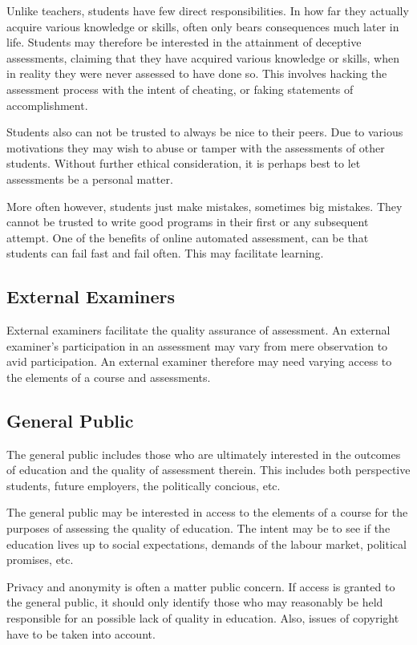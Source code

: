 Unlike teachers, students have few direct responsibilities. In how far they
actually acquire various knowledge or skills, often only bears consequences
much later in life. Students may therefore be interested in the attainment of
deceptive assessments, claiming that they have acquired various knowledge or
skills, when in reality they were never assessed to have done so. This involves
hacking the assessment process with the intent of cheating, or faking
statements of accomplishment.

Students also can not be trusted to always be nice to their peers. Due to
various motivations they may wish to abuse or tamper with the assessments of
other students. Without further ethical consideration, it is perhaps best to
let assessments be a personal matter.

More often however, students just make mistakes, sometimes big mistakes. They
cannot be trusted to write good programs in their first or any subsequent
attempt.  One of the benefits of online automated assessment, can be that
students can fail fast and fail often.  This may facilitate learning.

\subsection{External Examiners}

External examiners facilitate the quality assurance of assessment. An external
examiner's participation in an assessment may vary from mere observation to
avid participation. An external examiner therefore may need varying access to
the elements of a course and assessments.

\subsection{General Public}

The general public includes those who are ultimately interested in the outcomes
of education and the quality of assessment therein. This includes both
perspective students, future employers, the politically concious, etc.

The general public may be interested in access to the elements of a course for
the purposes of assessing the quality of education. The intent may be to see if
the education lives up to social expectations, demands of the labour market,
political promises, etc.

Privacy and anonymity is often a matter public concern. If access is granted to
the general public, it should only identify those who may reasonably be held
responsible for an possible lack of quality in education. Also, issues of
copyright have to be taken into account.

